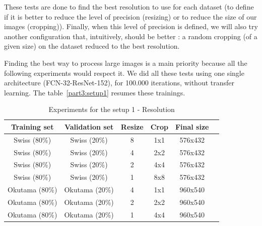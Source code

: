 These tests are done to find the best resolution to use for each dataset (to define if it is better to reduce the level of precision (resizing) or to reduce the size of our images (cropping)). Finally, when this level of precision is defined, we will also try another configuration that, intuitively, should be better : a random cropping (of a given size) on the dataset reduced to the best resolution.

Finding the best way to process large images is a main priority because all the following experiments would respect it. We did all these tests using one single architecture (FCN-32-ResNet-152), for 100.000 iterations, without transfer learning. The table~\ref{part3:setup1} resumes these trainings.

\begin{table}[ht!]
  
  \begin{subtable}{\textwidth}
    \centering
    \begin{tabular}{cccccc}
    \rowcolor{gray!50}
    \toprule
    \textbf{Training set} & \textbf{Validation set} & \textbf{Resize} & \textbf{Crop} & \textbf{Final size}\\
    \midrule
    Swiss (80\%)     & Swiss (20\%)       & 8           & 1x1         & 576x432		 \\
	Swiss (80\%)     & Swiss (20\%)       & 4           & 2x2         & 576x432		 \\
	Swiss (80\%)     & Swiss (20\%)       & 2           & 4x4         & 576x432		 \\
	Swiss (80\%)     & Swiss (20\%)       & 1           & 8x8         & 576x432		 \\
    \midrule
	Okutama (80\%)   & Okutama (20\%)     & 4           & 1x1         & 960x540		 \\
	Okutama (80\%)   & Okutama (20\%)     & 2           & 2x2         & 960x540		 \\
	Okutama (80\%)   & Okutama (20\%)     & 1           & 4x4         & 960x540		 \\
    \bottomrule
    \end{tabular}%
    \caption{Experiments for the setup 1 - Resolution}
    \label{part3:setup1:resolution}
  \end{subtable}
  

\end{table}
